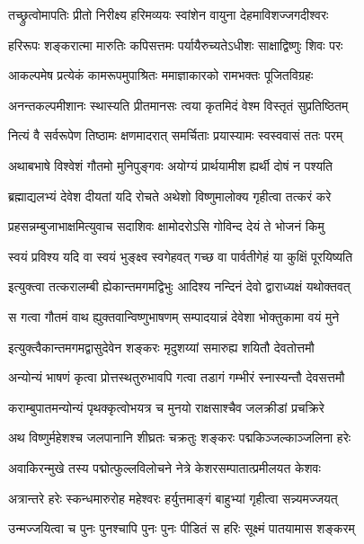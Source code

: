 \twolineshloka
{तच्छ्रुत्वोमापतिः प्रीतो निरीक्ष्य हरिमव्ययः}
{स्वांशेन वायुना देहमाविशज्जगदीश्वरः}%

\twolineshloka
{हरिरूपः शङ्करात्मा मारुतिः कपिसत्तमः}
{पर्यायैरुच्यतेऽधीशः साक्षाद्विष्णुः शिवः परः}%

\twolineshloka
{आकल्पमेष प्रत्येकं कामरूपमुपाश्रितः}
{ममाज्ञाकारको रामभक्तः पूजितविग्रहः}%

\twolineshloka
{अनन्तकल्पमीशानः स्थास्यति प्रीतमानसः}
{त्वया कृतमिदं वेश्म विस्तृतं सुप्रतिष्ठितम्}%

\twolineshloka
{नित्यं वै सर्वरूपेण तिष्ठामः क्षणमादरात्}
{समर्चिताः प्रयास्यामः स्वस्ववासं ततः परम्}%

\twolineshloka
{अथाबभाषे विश्वेशं गौतमो मुनिपुङ्गवः}
{अयोग्यं प्रार्थयामीश ह्यर्थी दोषं न पश्यति}%

\twolineshloka
{ब्रह्माद्यलभ्यं देवेश दीयतां यदि रोचते}
{अथेशो विष्णुमालोक्य गृहीत्वा तत्करं करे}%

\twolineshloka
{प्रहसन्नम्बुजाभाक्षमित्युवाच सदाशिवः}
{क्षामोदरोऽसि गोविन्द देयं ते भोजनं किमु}%

\twolineshloka
{स्वयं प्रविश्य यदि वा स्वयं भुङ्क्ष्व स्वगेहवत्}
{गच्छ वा पार्वतीगेहं या कुक्षिं पूरयिष्यति}%

\twolineshloka
{इत्युक्त्वा तत्करालम्बी ह्येकान्तमगमद्विभुः}
{आदिश्य नन्दिनं देवो द्वाराध्यक्षं यथोक्तवत्}%

\twolineshloka
{स गत्वा गौतमं वाथ ह्युक्तवान्विष्णुभाषणम्}
{सम्पादयान्नं देवेशा भोक्तुकामा वयं मुने}%

\twolineshloka
{इत्युक्त्वैकान्तमगमद्वासुदेवेन शङ्करः}
{मृदुशय्यां समारुह्य शयितौ देवतोत्तमौ}%

\twolineshloka
{अन्योन्यं भाषणं कृत्वा प्रोत्तस्थतुरुभावपि}
{गत्वा तडागं गम्भीरं स्नास्यन्तौ देवसत्तमौ}%

\twolineshloka
{कराम्बुपातमन्योन्यं पृथक्कृत्वोभयत्र च}
{मुनयो राक्षसाश्चैव जलक्रीडां प्रचक्रिरे}%

\twolineshloka
{अथ विष्णुर्महेशश्च जलपानानि शीघ्रतः}
{चक्रतुः शङ्करः पद्मकिञ्जल्काञ्जलिना हरेः}%

\twolineshloka
{अवाकिरन्मुखे तस्य पद्मोत्फुल्लविलोचने}
{नेत्रे केशरसम्पातात्प्रमीलयत केशवः}%

\twolineshloka
{अत्रान्तरे हरेः स्कन्धमारुरोह महेश्वरः}
{हर्युत्तमाङ्गं बाहुभ्यां गृहीत्वा सन्न्यमज्जयत्}%

\twolineshloka
{उन्मज्जयित्वा च पुनः पुनश्चापि पुनः पुनः}
{पीडितं स हरिः सूक्ष्मं पातयामास शङ्करम्}%

